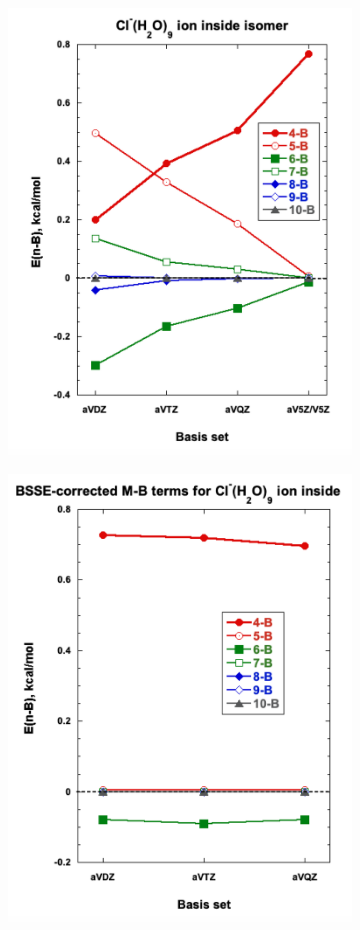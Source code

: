 \documentclass[11pt, proquest]{uwthesis}[2020/02/24]
\begin{document}
\begin{figure}
  \begin{subfigure}[t]{.5\textwidth}
    \centering
    \includegraphics[width=.9\linewidth]{Figures/Chapter_3/figure_8_bl.pdf}
  \end{subfigure}
  \hfill
  \begin{subfigure}[t]{.5\textwidth}
    \centering
    \includegraphics[width=.9\linewidth]{Figures/Chapter_3/figure_8_br.pdf}

\end{subfigure}
\end{figure}
\end{document}
